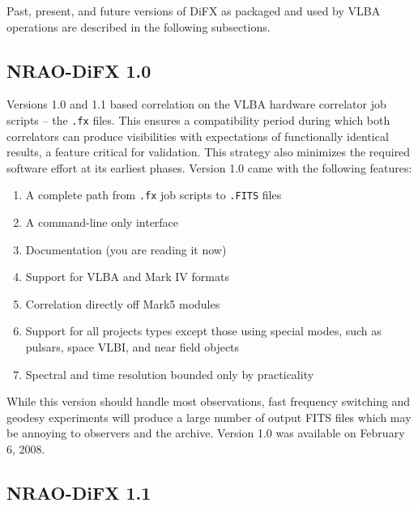Past, present, and future versions of DiFX as packaged and used by VLBA operations are described in the following subsections.



\subsection{NRAO-DiFX 1.0}

Versions 1.0 and 1.1 based correlation on the VLBA hardware correlator job scripts -- the {\tt .fx} files.
This ensures a compatibility period during which both correlators can produce visibilities with expectations of functionally identical results, a feature critical for validation.
This strategy also minimizes the required software effort at its earliest phases.
Version 1.0 came with the following features:
\begin{enumerate}
\item A complete path from {\tt .fx} job scripts to {\tt .FITS} files
\item A command-line only interface
\item Documentation (you are reading it now)
\item Support for VLBA and Mark IV formats
\item Correlation directly off Mark5 modules
\item Support for all projects types except those using special modes, such as pulsars, space VLBI, and near field objects
\item Spectral and time resolution bounded only by practicality
\end{enumerate}
While this version should handle most observations, fast frequency switching and geodesy experiments will produce a large number of output FITS files which may be annoying to observers and the archive.
Version 1.0 was available on February 6, 2008.

\subsection{NRAO-DiFX 1.1}

